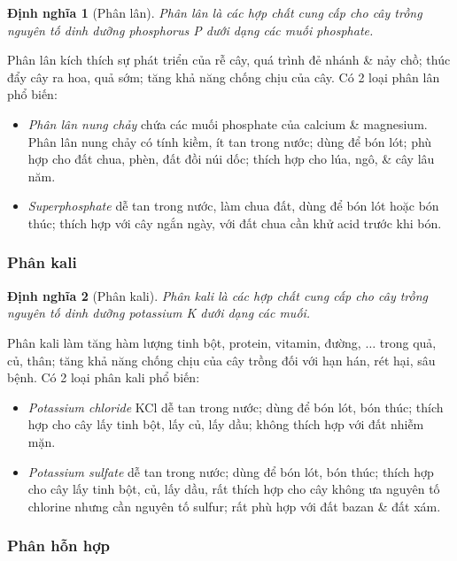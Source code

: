 \documentclass{article}
\newtheorem{dinhnghia}{Định nghĩa}
\begin{document}
\begin{dinhnghia}[Phân lân]
	{\rm Phân lân} là các hợp chất cung cấp cho cây trồng nguyên tố dinh dưỡng phosphorus {\rm P} dưới dạng các muối phosphate.
\end{dinhnghia}
Phân lân kích thích sự phát triển của rễ cây, quá trình đẻ nhánh \& nảy chồ; thúc đẩy cây ra hoa, quả sớm; tăng khả năng chống chịu của cây. Có 2 loại phân lân phổ biến:
\begin{itemize}
	\item \textit{Phân lân nung chảy} chứa các muối phosphate của calcium \& magnesium. Phân lân nung chảy có tính kiềm, ít tan trong nước; dùng để bón lót; phù hợp cho đất chua, phèn, đất đồi núi dốc; thích hợp cho lúa, ngô, \& cây lâu năm.
	\item \textit{Superphosphate}  dễ tan trong nước, làm chua đất, dùng để bón lót hoặc bón thúc; thích hợp với cây ngắn ngày, với đất chua cần khử acid trước khi bón.
\end{itemize}

\subsubsection{Phân kali}

\begin{dinhnghia}[Phân kali]
	{\rm Phân kali} là các hợp chất cung cấp cho cây trồng nguyên tố dinh dưỡng potassium {\rm K} dưới dạng các muối.
\end{dinhnghia}
Phân kali làm tăng hàm lượng tinh bột, protein, vitamin, đường, $\ldots$ trong quả, củ, thân; tăng khả năng chống chịu của cây trồng đối với hạn hán, rét hại, sâu bệnh. Có 2 loại phân kali phổ biến:
\begin{itemize}
	\item \textit{Potassium chloride} KCl dễ tan trong nước; dùng để bón lót, bón thúc; thích hợp cho cây lấy tinh bột, lấy củ, lấy dầu; không thích hợp với đất nhiễm mặn.
	\item \textit{Potassium sulfate}  dễ tan trong nước; dùng để bón lót, bón thúc; thích hợp cho cây lấy tinh bột, củ, lấy dầu, rất thích hợp cho cây không ưa nguyên tố chlorine nhưng cần nguyên tố sulfur; rất phù hợp với đất bazan \& đất xám.
\end{itemize}

\subsubsection{Phân hỗn hợp}
\end{document}

